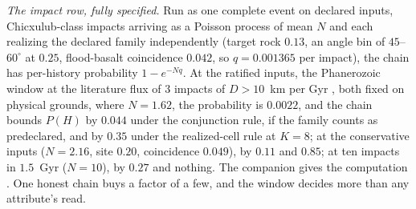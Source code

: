 \noindent\textit{The impact row, fully specified.} Run as one complete event on declared inputs, Chicxulub-class impacts arriving as a Poisson process of mean $N$ and each realizing the declared family independently (target rock $0.13$, an angle bin of $45$--$60^{\circ}$ at $0.25$, flood-basalt coincidence $0.042$, so $q = 0.001365$ per impact), the chain has per-history probability $1 - e^{-Nq}$. At the ratified inputs, the Phanerozoic window at the literature flux of $3$ impacts of $D > 10$~km per Gyr \cite{nesvorny2021dark}, both fixed on physical grounds, where $N = 1.62$, the probability is $0.0022$, and the chain bounds $P(H)$ by $0.044$ under the conjunction rule, if the family counts as predeclared, and by $0.35$ under the realized-cell rule at $K = 8$; at the conservative inputs ($N = 2.16$, site $0.20$, coincidence $0.049$), by $0.11$ and $0.85$; at ten impacts in $1.5$~Gyr ($N = 10$), by $0.27$ and nothing. The companion gives the computation \cite{Nexus}. One honest chain buys a factor of a few, and the window decides more than any attribute's read.

